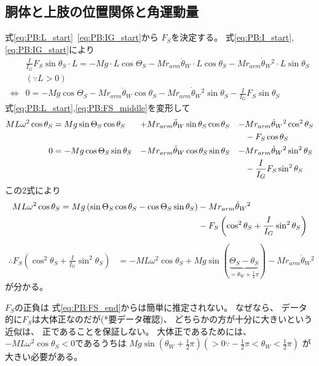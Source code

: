 \documentclass[a4paper,11pt]{jsarticle}
\begin{document}
\subsection{胴体と上肢の位置関係と角運動量}
式\ref{eq:PB:L_start}~\ref{eq:PB:IG_start}から
$F_S$を決定する。
式\ref{eq:PB:I_start},\ref{eq:PB:IG_start}により
\begin{align}
  & \frac{I}{I_G}F_S\sin\theta_S \cdot L 
  = -Mg \cdot L\cos\Theta_S
  - Mr_{arm}\ddot{\theta}_W \cdot L \cos\theta_S
  - Mr_{arm}\dot{\theta}_W{}^2 \cdot L \sin\theta_S
  \\
  & \left( \because L > 0 \right)
  \\
  \Leftrightarrow
  & 0
  = -Mg \cos\Theta_S
  - Mr_{arm}\ddot{\theta}_W \cos\theta_S
  - Mr_{arm}\dot{\theta}_W{}^2 \sin\theta_S
  - \frac{I}{I_G}F_S\sin\theta_S
  \label{eq:PB:FS_middle}
\end{align}
式\ref{eq:PB:L_start},\ref{eq:PB:FS_middle}を変形して
\begin{align}
  ML\omega^2 \cos\theta_S
  &= Mg\sin\Theta_S \cos\theta_S
  &+& Mr_{arm}\ddot{\theta}_W\sin\theta_S  \cos\theta_S
  &-& Mr_{arm}\dot{\theta}_W{}^2\cos^2\theta_S 
  \notag
  \\
  &&&&& - F_S\cos\theta_S
  \\
  0 
  &= -Mg \cos\Theta_S \sin\theta_S
  &-& Mr_{arm}\ddot{\theta}_W \cos\theta_S \sin\theta_S
  &-& Mr_{arm}\dot{\theta}_W{}^2 \sin^2\theta_S
  \notag
  \\
  &&&&& - \frac{I}{I_G}F_S\sin^2\theta_S
\end{align}
この2式により
\begin{align}
  ML\omega^2 \cos\theta_S 
  = Mg\left( \sin\Theta_S \cos\theta_S - \cos\Theta_S \sin\theta_S\right)
  &- Mr_{arm}\dot{\theta}_W{}^2
  \notag
  \\
  &- F_S\left( \cos^2\theta_S + \frac{I}{I_G}\sin^2\theta_S \right)
\end{align}
\begin{align}
  \therefore
  F_S\left( \cos^2\theta_S + \frac{I}{I_G}\sin^2\theta_S \right)
  &= -ML\omega^2 \cos\theta_S + Mg \sin(\underbrace{\Theta_S - \theta_S}_{=\theta_W+\frac{1}{2}\pi})
  - Mr_{arm}\dot{\theta}_W{}^2
  \label{eq:PB:FS_end}
\end{align}
が分かる。

$F_S$の正負は
式\ref{eq:PB:FS_end}からは簡単に推定されない。
なぜなら、
データ的に$F_S$は大体正なのだが(*要データ確認)、
どちらかの方が十分に大きいという近似は、
正であることを保証しない。
大体正であるためには、
$-ML\omega^2\cos\theta_S < 0$であるうちは
$Mg\sin(\theta_W + \frac{1}{2}\pi) ( > 0 \because -\frac{1}{2}\pi < \theta_W < \frac{1}{2}\pi )$
が大きい必要がある。
\end{document}
